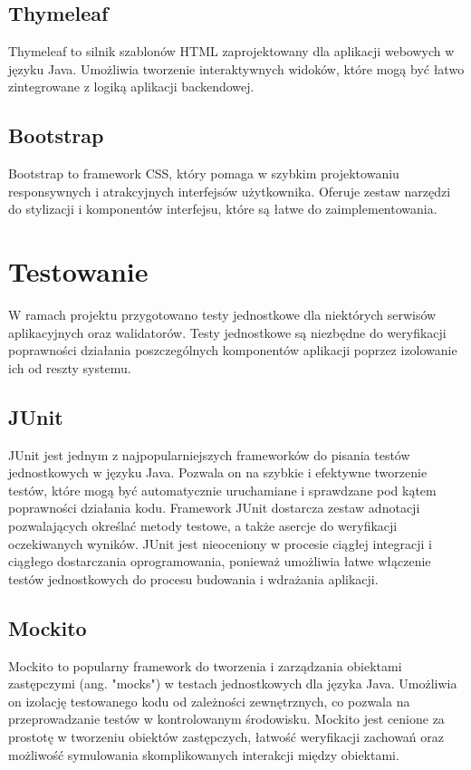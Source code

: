 \documentclass[shortabstract]{iithesis}
\begin{document}
\subsection{Thymeleaf}
Thymeleaf to silnik szablonów HTML zaprojektowany dla aplikacji webowych w języku Java. Umożliwia tworzenie interaktywnych widoków, które mogą być łatwo zintegrowane z logiką aplikacji backendowej\cite{thymeleaf}.

\subsection{Bootstrap}
Bootstrap to framework CSS, który pomaga w szybkim projektowaniu responsywnych i atrakcyjnych interfejsów użytkownika. Oferuje zestaw narzędzi do stylizacji i komponentów interfejsu, które są łatwe do zaimplementowania\cite{bootstrap}.

\section{Testowanie}

W ramach projektu przygotowano testy jednostkowe dla niektórych serwisów aplikacyjnych oraz walidatorów. Testy jednostkowe są niezbędne do weryfikacji poprawności działania poszczególnych komponentów aplikacji poprzez izolowanie ich od reszty systemu.

\subsection{JUnit}

JUnit jest jednym z najpopularniejszych frameworków do pisania testów jednostkowych w języku Java. Pozwala on na szybkie i efektywne tworzenie testów, które mogą być automatycznie uruchamiane i sprawdzane pod kątem poprawności działania kodu. Framework JUnit dostarcza zestaw adnotacji pozwalających określać metody testowe, a także asercje do weryfikacji oczekiwanych wyników. JUnit jest nieoceniony w procesie ciągłej integracji i ciągłego dostarczania oprogramowania, ponieważ umożliwia łatwe włączenie testów jednostkowych do procesu budowania i wdrażania aplikacji\cite{junit}.

\subsection{Mockito}

Mockito to popularny framework do tworzenia i zarządzania obiektami zastępczymi (ang. "mocks") w testach jednostkowych dla języka Java. Umożliwia on izolację testowanego kodu od zależności zewnętrznych, co pozwala na przeprowadzanie testów w kontrolowanym środowisku. Mockito jest cenione za prostotę w tworzeniu obiektów zastępczych, łatwość weryfikacji zachowań oraz możliwość symulowania skomplikowanych interakcji między obiektami\cite{mockito}.
\end{document}
